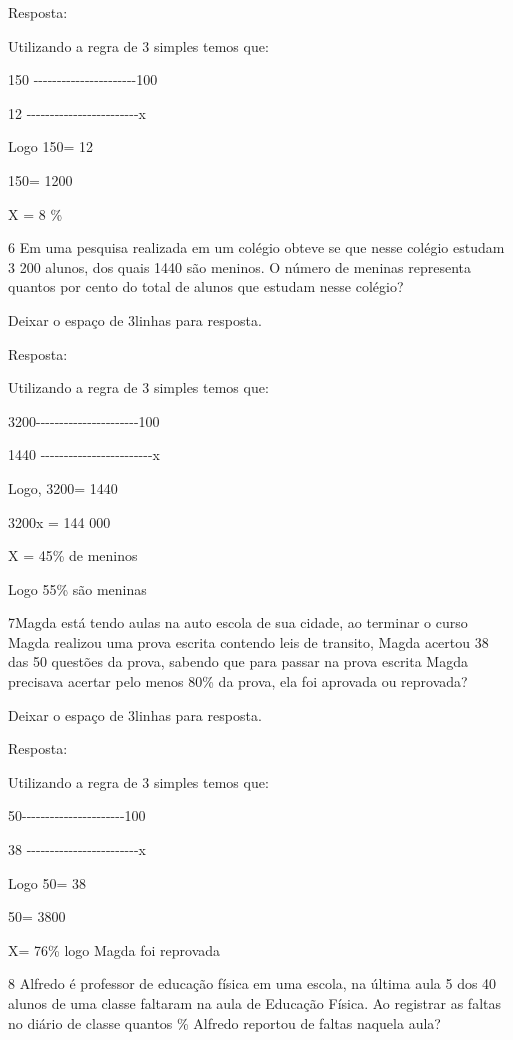 Resposta:

Utilizando a regra de 3 simples temos que:

150 -\/-\/-\/-\/-\/-\/-\/-\/-\/-\/-\/-\/-\/-\/-\/-\/-\/-\/-\/-\/-\/-100

12
-\/-\/-\/-\/-\/-\/-\/-\/-\/-\/-\/-\/-\/-\/-\/-\/-\/-\/-\/-\/-\/-\/-\/-x

Logo 150\times \times = 12

150\times = 1200

X = 8 \%

\num{6} Em uma pesquisa realizada em um colégio obteve se que nesse colégio
estudam 3 200 alunos, dos quais 1440 são meninos. O número de meninas
representa quantos por cento do total de alunos que estudam nesse
colégio?

Deixar o espaço de 3linhas para resposta.

Resposta:

Utilizando a regra de 3 simples temos que:

3200-\/-\/-\/-\/-\/-\/-\/-\/-\/-\/-\/-\/-\/-\/-\/-\/-\/-\/-\/-\/-\/-100

1440
-\/-\/-\/-\/-\/-\/-\/-\/-\/-\/-\/-\/-\/-\/-\/-\/-\/-\/-\/-\/-\/-\/-\/-x

Logo, 3200\times \times = 1440

3200x = 144 000

X = 45\% de meninos

Logo 55\% são meninas

\num{7}\times Magda está tendo aulas na auto escola de sua cidade, ao terminar o
curso Magda realizou uma prova escrita contendo leis de transito, Magda
acertou 38 das 50 questões da prova, sabendo que para passar na prova
escrita Magda precisava acertar pelo menos 80\% da prova, ela foi
aprovada ou reprovada?

Deixar o espaço de 3linhas para resposta.

Resposta:

Utilizando a regra de 3 simples temos que:

50-\/-\/-\/-\/-\/-\/-\/-\/-\/-\/-\/-\/-\/-\/-\/-\/-\/-\/-\/-\/-\/-100

38
-\/-\/-\/-\/-\/-\/-\/-\/-\/-\/-\/-\/-\/-\/-\/-\/-\/-\/-\/-\/-\/-\/-\/-x

Logo 50\times \times = 38

50\times = 3800

X= 76\% logo Magda foi reprovada

\num{8} Alfredo é professor de educação física em uma escola, na última aula
5 dos 40 alunos de uma classe faltaram na aula de Educação Física. Ao
registrar as faltas no diário de classe quantos \% Alfredo reportou de
faltas naquela aula?

